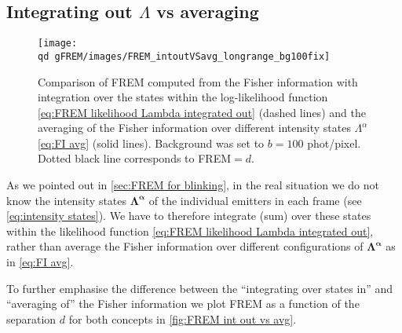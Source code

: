 \subsection{Integrating out $\Lambda$ vs averaging\label{sub:Int out vs avg}}
\begin{figure}[!hbt]
	\centering
	\newcommand{\wf}{.49\textwidth}
		\texttt{[image: \\qd gFREM/images/FREM\_intoutVSavg\_longrange\_bg100fix]}
		
	\caption{Comparison of FREM computed from the Fisher information with integration over the states within the log-likelihood function \autoref{eq:FREM likelihood Lambda integrated out} (dashed lines) and the averaging of the Fisher information over different intensity states $\Lambda^{\alpha}$ \autoref{eq:FI avg} (solid lines). Background was set to $b=100$ phot/pixel. Dotted black line corresponds to FREM$=d$.}
	\label{fig:FREM int out vs avg}
\end{figure}
% 
As we pointed out in \autoref{sec:FREM for blinking}, in the real situation we do not know the intensity states $\bm{\Lambda^{\alpha}}$ of the individual emitters in each frame (see \autoref{eq:intensity states}). We have to therefore integrate (sum) over these states within the likelihood function \autoref{eq:FREM likelihood Lambda integrated out}, rather than average the Fisher information over different configurations of $\bm{\Lambda^{\alpha}}$ as in \autoref{eq:FI avg}. 

To further emphasise the difference between the ``integrating over states in'' and ``averaging of'' the Fisher information we plot FREM as a function of the separation $d$ for both concepts in \autoref{fig:FREM int out vs avg}.

